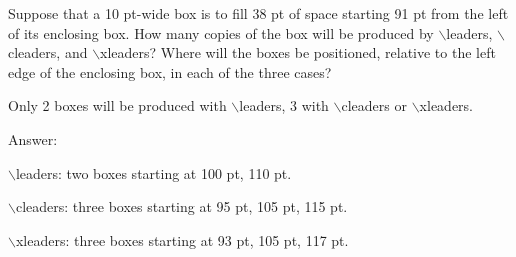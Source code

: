 \def\\{$\backslash$}

Suppose that a 10 pt-wide box is to fill 38 pt of space starting 91 pt from the
left of its enclosing box. How many copies of the box will be produced by \\leaders,
\\cleaders, and \\xleaders? Where will the boxes be positioned, relative to the left
edge of the enclosing box, in each of the three cases?

Only 2 boxes will be produced with \\leaders, 3 with \\cleaders or \\xleaders.

Answer:

\\leaders: two boxes starting at 100 pt, 110 pt.

\\cleaders: three boxes starting at 95 pt, 105 pt, 115 pt.

\\xleaders: three boxes starting at 93 pt, 105 pt, 117 pt.
\bye

